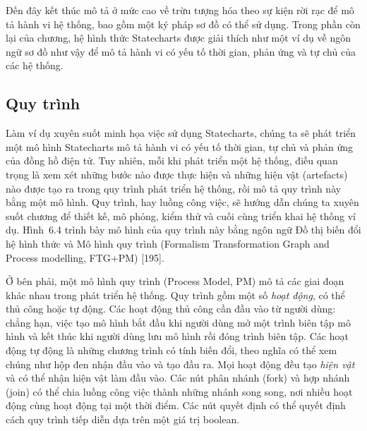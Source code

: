 Đến đây kết thúc mô tả ở mức cao về trừu tượng hóa theo sự kiện rời rạc để mô tả hành vi hệ thống, bao gồm một ký pháp sơ đồ có thể sử dụng. Trong phần còn lại của chương, hệ hình thức Statecharts được giải thích như một ví dụ về ngôn ngữ sơ đồ như vậy để mô tả hành vi có yếu tố thời gian, phản ứng và tự chủ của các hệ thống.


\subsection{Quy trình}
Làm ví dụ xuyên suốt minh họa việc sử dụng Statecharts, chúng ta sẽ phát triển một mô hình Statecharts mô tả hành vi có yếu tố thời gian, tự chủ và phản ứng của đồng hồ điện tử. Tuy nhiên, mỗi khi phát triển một hệ thống, điều quan trọng là xem xét những bước nào được thực hiện và những hiện vật (artefacts) nào được tạo ra trong quy trình phát triển hệ thống, rồi mô tả quy trình này bằng một mô hình. Quy trình, hay luồng công việc, sẽ hướng dẫn chúng ta xuyên suốt chương để thiết kế, mô phỏng, kiểm thử và cuối cùng triển khai hệ thống ví dụ. Hình~6.4 trình bày mô hình của quy trình này bằng ngôn ngữ Đồ thị biến đổi hệ hình thức và Mô hình quy trình (Formalism Transformation Graph and Process modelling, FTG+PM) [195].

Ở bên phải, một mô hình quy trình (Process Model, PM) mô tả các giai đoạn khác nhau trong phát triển hệ thống. Quy trình gồm một số \emph{hoạt động}, có thể thủ công hoặc tự động. Các hoạt động thủ công cần đầu vào từ người dùng: chẳng hạn, việc tạo mô hình bắt đầu khi người dùng mở một trình biên tập mô hình và kết thúc khi người dùng lưu mô hình rồi đóng trình biên tập. Các hoạt động tự động là những chương trình có tính biến đổi, theo nghĩa có thể xem chúng như hộp đen nhận đầu vào và tạo đầu ra. Mọi hoạt động đều tạo \emph{hiện vật} và có thể nhận hiện vật làm đầu vào. Các nút phân nhánh (fork) và hợp nhánh (join) có thể chia luồng công việc thành những nhánh song song, nơi nhiều hoạt động cùng hoạt động tại một thời điểm. Các nút quyết định có thể quyết định cách quy trình tiếp diễn dựa trên một giá trị boolean.

